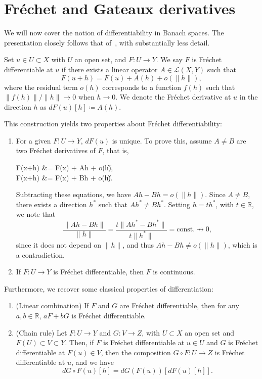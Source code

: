 \section{Fréchet and Gateaux derivatives}
We will now cover the notion of differentiability in Banach spaces. The presentation closely follows that of~\cite{ambrosetti1995primer}, with substantially less detail.
\begin{definition}
    Set $u\in U \subset X$ with $U$ an open set, and $F:U\to Y$. We say $F$ is Fréchet differentiable at $u$ if there exists a linear operator $A\in \mathcal{L}(X,Y)$ such that
    \begin{equation}\label{eq:frechet-derivative}
        F(u+h)=F(u)+A(h)+o(\|h\|),
    \end{equation}
    where the residual term $o(h)$ corresponds to a function $f(h)$ such that $\|f(h)\|/\|h\| \to 0$ when $h\to 0$. We denote the Fréchet derivative at $u$ in the direction $h$ as $dF(u)[h] \coloneqq A(h)$.
\end{definition}
This construction yields two properties about Fréchet differentiability:
\begin{enumerate}
    \item For a given $F:U\to Y$, $dF(u)$ is unique. To prove this, assume $A\neq B$ are two Fréchet derivatives of $F$, that is, 
    \begin{tightalign*}
            F(x+h) &= F(x) + Ah + o(\|h\|), \\
            F(x+h) &= F(x) + Bh + o(\|h\|).
    \end{tightalign*}
    Subtracting these equations, we have $Ah - Bh = o(\|h\|)$. Since $A\neq B$, there exists a direction $h^*$ such that $Ah^* \neq Bh^*$. Setting $h=th^*$, with $t\in \mathbb{R}$, we note that
    \begin{equation*}
        \frac{\|Ah-Bh\|}{\|h\|} = \frac{t\|Ah^*-Bh^*\|}{t\|h^*\|} = \text{const.} \nrightarrow 0,
    \end{equation*}
    since it does not depend on $\|h\|$, and thus $Ah - Bh \neq o(\|h\|)$, which is a contradiction. 
    \item If $F:U\to Y$ is Fréchet differentiable, then $F$ is continuous.
\end{enumerate}

Furthermore, we recover some classical properties of differentiation:
\begin{enumerate}
    \item (Linear combination) If $F$ and $G$ are Fréchet differentiable, then for any $a,b\in\mathbb{R}$, $aF+bG$ is Fréchet differentiable.
    \item (Chain rule) Let $F:U\to Y$ and $G:V\to Z$, with $U\subset X$ an open set and $F(U)\subset V\subset Y$. Then, if $F$ is Fréchet differentiable at $u\in U$ and $G$ is Fréchet differentiable at $F(u)\in V$, then the composition $G\circ F:U\to Z$ is Fréchet differentiable at $u$, and we have
        \begin{equation*}
            dG\circ F(u)[h] = dG(F(u))[dF(u)[h]].
        \end{equation*}
\end{enumerate}

